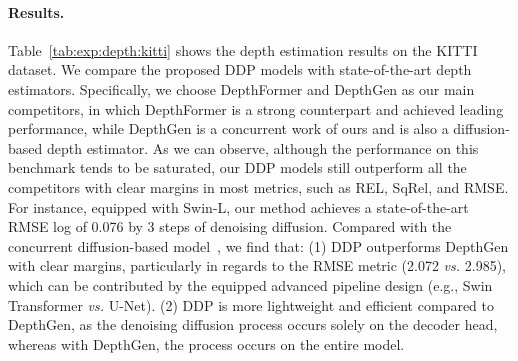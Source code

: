 \documentclass[10pt,twocolumn,letterpaper]{article}
\newcommand{\ours}[0]{DDP\xspace}
\begin{document}
\paragraph{Results.}
Table~\ref{tab:exp:depth:kitti} shows the depth estimation results on the KITTI dataset.
We compare the proposed \ours models with state-of-the-art depth estimators. 
Specifically, we choose DepthFormer \cite{li2022depthformer} and DepthGen \cite{saxena2023depthgen} as our main competitors, in which DepthFormer is a strong counterpart and achieved leading performance, while DepthGen is a concurrent work of ours and is also a diffusion-based depth estimator.
As we can observe, although the performance on this benchmark tends to be saturated,
our \ours models still outperform all the competitors with clear margins in most metrics, such as REL, SqRel, and RMSE.
For instance, equipped with Swin-L, our method achieves a state-of-the-art RMSE log of 0.076 by 3 steps of denoising diffusion. 
Compared with the concurrent diffusion-based model~\cite{saxena2023depthgen}, we find that:
(1) \ours outperforms DepthGen with clear margins, particularly in regards to the RMSE metric (2.072 \emph{vs.} 2.985), which can be contributed by the equipped advanced pipeline design (e.g., Swin Transformer \emph{vs.} U-Net).
(2) \ours is more lightweight and efficient compared to DepthGen, as the denoising diffusion process occurs solely on the decoder head, whereas with DepthGen, the process occurs on the entire model.
\end{document}
